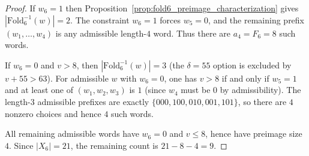 \begin{proof}
If $w_6=1$ then Proposition~\ref{prop:fold6_preimage_characterization} gives $|\mathrm{Fold}_6^{-1}(w)|=2$.
The constraint $w_6=1$ forces $w_5=0$, and the remaining prefix $(w_1,\dots,w_4)$ is any admissible length-$4$ word.
Thus there are $a_4=F_6=8$ such words.

If $w_6=0$ and $v>8$, then $|\mathrm{Fold}_6^{-1}(w)|=3$ (the $\delta=55$ option is excluded by $v+55>63$).
For admissible $w$ with $w_6=0$, one has $v>8$ if and only if $w_5=1$ and at least one of $(w_1,w_2,w_3)$ is $1$ (since $w_4$ must be $0$ by admissibility).
The length-$3$ admissible prefixes are exactly $\{000,100,010,001,101\}$, so there are $4$ nonzero choices and hence $4$ such words.

All remaining admissible words have $w_6=0$ and $v\le 8$, hence have preimage size $4$.
Since $|X_6|=21$, the remaining count is $21-8-4=9$.
\end{proof}


